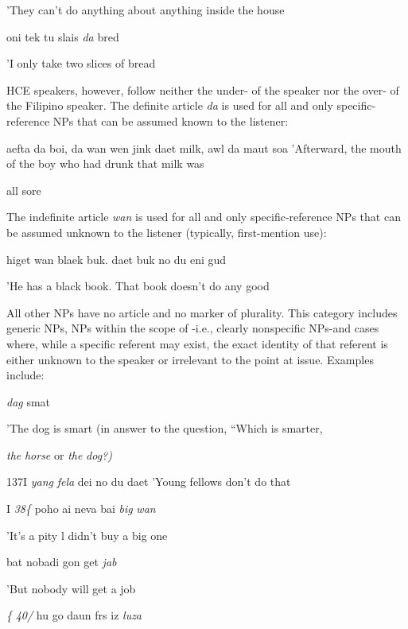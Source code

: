 'They can't do anything about anything inside the house

\ea\label{ex:33}
 oni tek tu slais \textit{da} bred
\glt
\z

'I only take two slices of bread

HCE speakers, however, follow neither the under- of the  speaker nor the over- of the Filipino speaker. The definite article \textit{da} is used for all and only specific-refer\-ence NPs that can be assumed known to the listener:

\ea\label{ex:34}
 aefta da boi, da wan wen jink daet milk, awl da maut soa 'Afterward, the mouth of the boy who had drunk that milk was
\glt
\z

all sore

The indefinite article \textit{wan} is used for all and only specific-reference NPs that can be assumed unknown to the listener (typically, first-mention use):

\ea\label{ex:35}
 higet wan blaek buk. daet buk no du eni gud
\glt
\z

'He has a black book. That book doesn't do any good

All other NPs have no article and no marker of plurality. This category includes generic NPs, NPs within the scope of -i.e., clearly nonspecific NPs-and cases where, while a specific referent may exist, the exact identity of that referent is either unknown to the speaker or irrelevant to the point at issue. Examples include:

\ea\label{ex:36}
 \textit{dag} smat
\glt
\z

'The dog is smart (in answer to the question, ``Which is smarter,

\textit{the} \textit{horse} or \textit{the} \textit{dog?{\textquotedbl})}

137I \textit{ya}\textit{n}\textit{g} \textit{fela} dei no du daet 'Young fellows don't do that


I \textit{38\{ }poho ai neva bai \textit{big} \textit{wan}

'It's a pity l didn't buy a big one

\ea\label{ex:39}
 bat nobadi gon get \textit{jab}
\glt
\z

'But nobody will get a job

\textit{\{} \textit{40/ }hu go daun frs iz \textit{luza}

